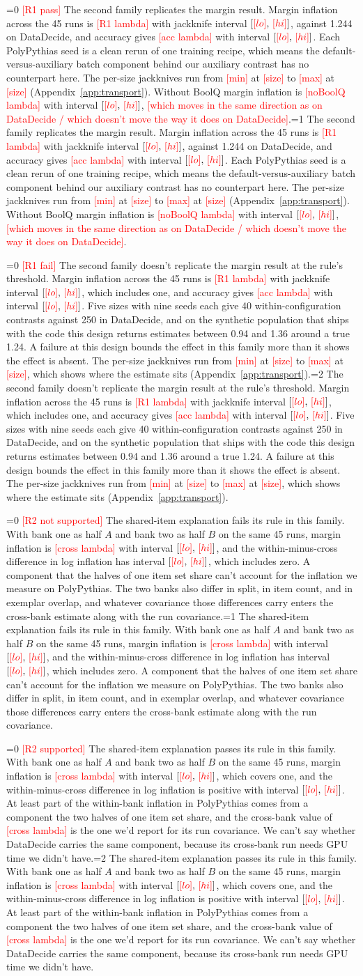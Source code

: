 \documentclass{article}
\newcommand{\ci}[2]{\ensuremath{[#1,\,#2]}}
\newcommand{\pending}[1]{\textcolor{red}{[#1]}}
\newcommand{\Ronecase}{0}
\newcommand{\Rtwocase}{0}
\newcommand{\outcome}[4]{\ifnum#1=0 \pending{#3} #4\else\ifnum#1=#2 #4\fi\fi}
\begin{document}
\outcome{\Ronecase}{1}{R1 pass}{The second family replicates the margin result. Margin inflation across the 45 runs is \pending{R1 lambda} with jackknife interval \ci{\pending{lo}}{\pending{hi}}, against 1.244 on DataDecide, and accuracy gives \pending{acc lambda} with interval \ci{\pending{lo}}{\pending{hi}}. Each PolyPythias seed is a clean rerun of one training recipe, which means the default-versus-auxiliary batch component behind our auxiliary contrast has no counterpart here. The per-size jackknives run from \pending{min} at \pending{size} to \pending{max} at \pending{size} (Appendix~\ref{app:transport}). Without BoolQ margin inflation is \pending{noBoolQ lambda} with interval \ci{\pending{lo}}{\pending{hi}}, \pending{which moves in the same direction as on DataDecide / which doesn't move the way it does on DataDecide}.}

\outcome{\Ronecase}{2}{R1 fail}{The second family doesn't replicate the margin result at the rule's threshold. Margin inflation across the 45 runs is \pending{R1 lambda} with jackknife interval \ci{\pending{lo}}{\pending{hi}}, which includes one, and accuracy gives \pending{acc lambda} with interval \ci{\pending{lo}}{\pending{hi}}. Five sizes with nine seeds each give 40 within-configuration contrasts against 250 in DataDecide, and on the synthetic population that ships with the code this design returns estimates between 0.94 and 1.36 around a true 1.24. A failure at this design bounds the effect in this family more than it shows the effect is absent. The per-size jackknives run from \pending{min} at \pending{size} to \pending{max} at \pending{size}, which shows where the estimate sits (Appendix~\ref{app:transport}).}

\outcome{\Rtwocase}{1}{R2 not supported}{The shared-item explanation fails its rule in this family. With bank one as half $A$ and bank two as half $B$ on the same 45 runs, margin inflation is \pending{cross lambda} with interval \ci{\pending{lo}}{\pending{hi}}, and the within-minus-cross difference in log inflation has interval \ci{\pending{lo}}{\pending{hi}}, which includes zero. A component that the halves of one item set share can't account for the inflation we measure on PolyPythias. The two banks also differ in split, in item count, and in exemplar overlap, and whatever covariance those differences carry enters the cross-bank estimate along with the run covariance.}

\outcome{\Rtwocase}{2}{R2 supported}{The shared-item explanation passes its rule in this family. With bank one as half $A$ and bank two as half $B$ on the same 45 runs, margin inflation is \pending{cross lambda} with interval \ci{\pending{lo}}{\pending{hi}}, which covers one, and the within-minus-cross difference in log inflation is positive with interval \ci{\pending{lo}}{\pending{hi}}. At least part of the within-bank inflation in PolyPythias comes from a component the two halves of one item set share, and the cross-bank value of \pending{cross lambda} is the one we'd report for its run covariance. We can't say whether DataDecide carries the same component, because its cross-bank run needs GPU time we didn't have.}
\end{document}
